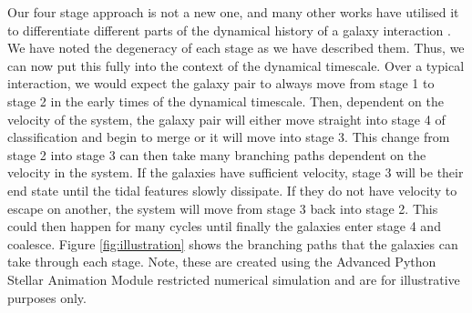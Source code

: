 Our four stage approach is not a new one, and many other works have utilised it to differentiate different parts of the dynamical history of a galaxy interaction \citep{2022ApJ...937...97C, 2023ApJ...952..122G}. We have noted the degeneracy of each stage as we have described them. Thus, we can now put this fully into the context of the dynamical timescale. Over a typical interaction, we would expect the galaxy pair to always move from stage 1 to stage 2 in the early times of the dynamical timescale. Then, dependent on the velocity of the system, the galaxy pair will either move straight into stage 4 of classification and begin to merge or it will move into stage 3. This change from stage 2 into stage 3 can then take many branching paths dependent on the velocity in the system. If the galaxies have sufficient velocity, stage 3 will be their end state until the tidal features slowly dissipate. If they do not have velocity to escape on another, the system will move from stage 3 back into stage 2. This could then happen for many cycles until finally the galaxies enter stage 4 and coalesce. Figure \ref{fig:illustration} shows the branching paths that the galaxies can take through each stage. Note, these are created using the Advanced Python Stellar Animation Module restricted numerical simulation \citep[][O'Ryan et al., in prep.]{2016A&C....16...26W} and are for illustrative purposes only.

